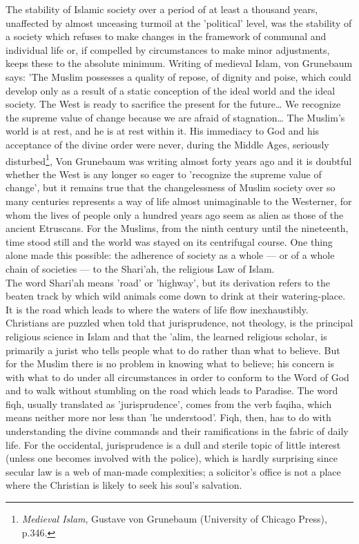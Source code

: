 \documentclass[11pt, b5paper, twoside]{book}
\begin{document}
The stability of Islamic society over a period of at least a thousand years, unaffected by almost 
unceasing turmoil at the 'political' level, was the stability of a society which refuses to make 
changes in the framework of communal and individual life or, if compelled by circumstances to make 
minor adjustments, keeps these to the absolute minimum. Writing of medieval Islam, von Grunebaum 
says: 'The Muslim possesses a quality of repose, of dignity and poise, which could develop only as a 
result of a static conception of the ideal world and the ideal society. The West is ready to 
sacrifice the present for the future\ldots{} We recognize the supreme value of change because we are 
afraid of stagnation\ldots{} The Muslim's world is at rest, and he is at rest within it. His immediacy to 
God and his acceptance of the divine order were never, during the Middle Ages, seriously 
disturbed\footnote{\emph{Medieval Islam}, Gustave von Grunebaum (University of Chicago Press), p.346.}, Von Grunebaum was writing almost forty years ago and it is doubtful whether the West 
is any longer so eager to 'recognize the supreme value of change', but it remains true that the 
changelessness of Muslim society over so many centuries represents a way of life almost unimaginable 
to the Westerner, for whom the lives of people only a hundred years ago seem as alien as those of the 
ancient Etruscans. For the Muslims, from the ninth century until the nineteenth, time stood still and 
the world was stayed on its centrifugal course. One thing alone made this possible: the adherence of 
society as a whole --- or of a whole chain of societies --- to the Shari'ah, the religious Law of Islam. \\

The word Shari'ah means 'road' or 'highway', but its derivation refers to the beaten track by which 
wild animals come down to drink at their watering-place. It is the road which leads to where the 
waters of life flow inexhaustibly. \\

Christians are puzzled when told that jurisprudence, not theology, is the principal religious science 
in Islam and that the 'alim, the learned religious scholar, is primarily a jurist who tells people 
what to do rather than what to believe. But for the Muslim there is no problem in knowing what to 
believe; his concern is with what to do under all circumstances in order to conform to the Word of 
God and to walk without stumbling on the road which leads to Paradise. The word fiqh, usually 
translated as 'jurisprudence', comes from the verb faqiha, which means neither more nor less than 'he 
understood'. Fiqh, then, has to do with understanding the divine commands and their ramifications in 
the fabric of daily life. For the occidental, jurisprudence is a dull and sterile topic of little 
interest (unless one becomes involved with the police), which is hardly surprising since secular law 
is a web of man-made complexities; a solicitor's office is not a place where the Christian is likely 
to seek his soul's salvation. \\
\end{document}

